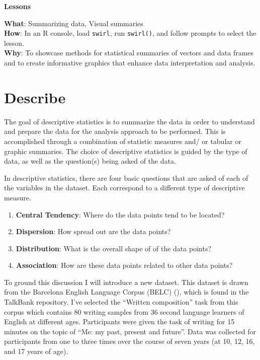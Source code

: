 \documentclass[
  letterpaper,
]{latex/krantz}
\providecommand{\tightlist}{%
  \setlength{\itemsep}{0pt}\setlength{\parskip}{0pt}}\usepackage{longtable,booktabs,array}
\theoremstyle{definition}
\theoremstyle{remark}
\begin{document}
\begin{tcolorbox}[enhanced jigsaw, colframe=quarto-callout-color-frame, breakable, bottomrule=.15mm, arc=.35mm, left=2mm, opacityback=0, rightrule=.15mm, colback=white, toprule=.15mm, leftrule=.75mm]

\textbf{ Lessons}

\textbf{What}: Summarizing data, Visual summaries\\
\textbf{How}: In an R console, load \texttt{swirl}, run
\texttt{swirl()}, and follow prompts to select the lesson.\\
\textbf{Why}: To showcase methods for statistical summaries of vectors
and data frames and to create informative graphics that enhance data
interpretation and analysis.

\end{tcolorbox}

\section{Describe}\label{sec-aa-describe}

The goal of descriptive statistics is to summarize the data in order to
understand and prepare the data for the analysis approach to be
performed. This is accomplished through a combination of statistic
measures and/ or tabular or graphic summaries. The choice of descriptive
statistics is guided by the type of data, as well as the question(s)
being asked of the data.

In descriptive statistics, there are four basic questions that are asked
of each of the variables in the dataset. Each correspond to a different
type of descriptive measure.

\begin{enumerate}
\def\labelenumi{\arabic{enumi}.}
\tightlist
\item
  \textbf{Central Tendency}: Where do the data points tend to be
  located?
\item
  \textbf{Dispersion}: How spread out are the data points?
\item
  \textbf{Distribution}: What is the overall shape of of the data
  points?
\item
  \textbf{Association}: How are these data points related to other data
  points?
\end{enumerate}

To ground this discussion I will introduce a new dataset. This dataset
is drawn from the Barcelona English Language Corpus (BELC)
(), which is found in the TalkBank
repository. I've selected the ``Written composition'' task from this
corpus which contains 80 writing samples from 36 second language
learners of English at different ages. Participants were given the task
of writing for 15 minutes on the topic of ``Me: my past, present and
future''. Data was collected for participants from one to three times
over the course of seven years (at 10, 12, 16, and 17 years of age).
\end{document}
